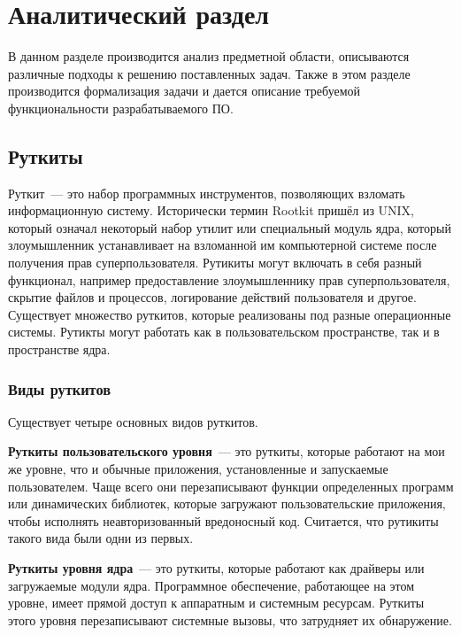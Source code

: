 \chapter{Аналитический раздел}%
\label{cha:analiticheskii_razdel}

В данном разделе производится анализ предметной области, описываются различные подходы к решению поставленных задач. Также в этом разделе производится формализация задачи и дается описание требуемой функциональности разрабатываемого ПО.

\section{Руткиты}%
\label{sec:rutkity}

Руткит~--- это набор программных инструментов, позволяющих взломать информационную систему. Исторически термин Rootkit пришёл из UNIX, который означал некоторый набор утилит или специальный модуль ядра, который злоумышленник устанавливает на взломанной им компьютерной системе после получения прав суперпользователя. Рутикиты могут включать в себя разный функционал, например предоставление злоумышленнику прав суперпользователя, скрытие файлов и процессов, логирование действий пользователя и другое. Существует множество руткитов, которые реализованы под разные операционные системы. Рутикты могут работать как в пользовательском пространстве, так и в пространстве ядра.

\subsection{Виды руткитов}%
\label{sub:vidy_rutkitov}

Существует четыре основных видов руткитов.

\textbf{Руткиты пользовательского уровня}~--- это руткиты, которые работают на мои же уровне, что и обычные приложения, установленные и запускаемые пользователем. Чаще всего они перезаписывают функции определенных программ или динамических библиотек, которые загружают пользовательские приложения, чтобы исполнять неавторизованный вредоносный код. Считается, что рутикиты такого вида были одни из первых.

\textbf{Руткиты уровня ядра}~--- это руткиты, которые работают как драйверы или загружаемые модули ядра. Программное обеспечение, работающее на этом уровне, имеет прямой доступ к аппаратным и системным ресурсам. Руткиты этого уровня перезаписывают системные вызовы, что затрудняет их обнаружение.

